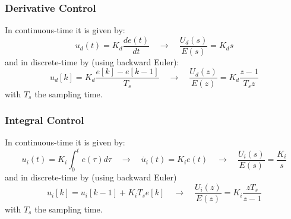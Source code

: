 \begin{frame}
	\frametitle{Derivative Control}
	In continuous-time it is given by:
	\begin{equation*}
		u_d(t) = K_d \frac{de(t)}{dt} \quad \rightarrow \quad \frac{U_d(s)}{E(s)} = K_d s 
	\end{equation*}
	and in discrete-time by (using backward Euler):
	\begin{equation*}
	u_d[k] = K_d \frac{ e[k] - e[k-1]}{T_s} \quad \rightarrow \quad \frac{U_d(z)}{E(z)} = K_d \frac{z - 1}{T_sz}
	\end{equation*}
	with $T_s$ the sampling time.
\end{frame}

\begin{frame}
	\frametitle{Integral Control}
	In continuous-time it is given by:
	\begin{equation*}
		u_i(t) = K_i \int_0^t e(\tau)d\tau \quad \rightarrow \quad \dot{u_i}(t) = K_i e(t) \quad \rightarrow \quad \frac{U_i(s)}{E(s)} = \frac{K_i}{s} 
	\end{equation*}
	and in discrete-time by (using backward Euler)
	\begin{equation*}
	u_i[k] = u_i[k-1] + K_i T_s e[k] \quad \rightarrow \quad \frac{U_i(z)}{E(z)} = K_i \frac{z T_s}{z - 1}
	\end{equation*}
	with $T_s$ the sampling time.
\end{frame}

